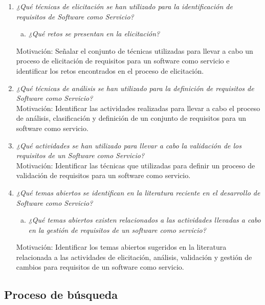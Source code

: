 \documentclass[conference,onecolumn,10pt]{IEEEtran}
\begin{document}
\begin{enumerate}[P 1.-]
  \item\emph{¿Qué técnicas de elicitación se han utilizado para la identificación de requisitos de Software como Servicio?}
  \begin{enumerate}[(a)]
  \item \emph{¿Qué retos se presentan en la elicitación?}
  \end{enumerate}
  Motivación: Señalar el conjunto de técnicas utilizadas para llevar a cabo un proceso de elicitación de requisitos para un software como servicio e identificar los retos encontrados en el proceso de elicitación. 
  
  \item\emph{¿Qué técnicas de análisis se han utilizado para la definición de requisitos de Software como Servicio?}\\
  Motivación: Identificar las actividades realizadas para llevar a cabo el proceso de análisis, clasificación y definición de un conjunto de requisitos para un software como servicio.

  \item\emph{¿Qué actividades se han utilizado para llevar a cabo la validación de los requisitos de un Software como Servicio?}\\
  Motivación: Identificar las técnicas que utilizadas para definir un proceso de validación de requisitos para un software como servicio.

  \item\emph{¿Qué temas abiertos se identifican en la literatura reciente en el desarrollo de Software como Servicio?}
  \begin{enumerate}[(a)]
  \item \emph{¿Qué temas abiertos existen relacionados a las actividades llevadas a cabo en la gestión de requisitos de un software como servicio?}
  \end{enumerate}
  Motivación: Identificar los temas abiertos sugeridos en la literatura relacionada a las actividades de elicitación, análisis, validación y gestión de cambios 
 para requisitos de un software como servicio.
\end{enumerate}

\subsection{Proceso de búsqueda}
\end{document}

